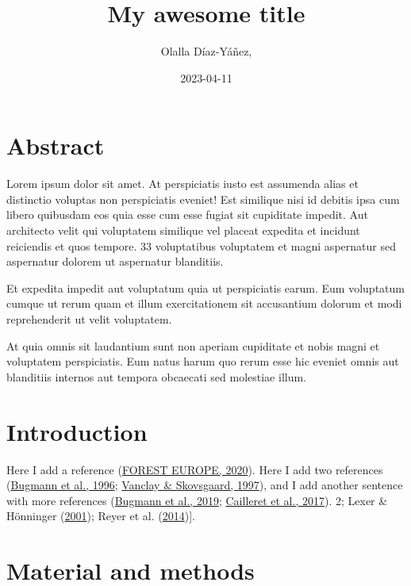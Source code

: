 \documentclass[
  12pt,
]{article}
\title{My awesome title}
\author{Olalla Díaz-Yáñez,}
\date{2023-04-11}
\begin{document}
\maketitle

\hypertarget{abstract}{%
\section{Abstract}\label{abstract}}

Lorem ipsum dolor sit amet. At perspiciatis iusto est assumenda alias et distinctio voluptas non perspiciatis eveniet! Est similique nisi id debitis ipsa cum libero quibusdam eos quia esse cum esse fugiat sit cupiditate impedit. Aut architecto velit qui voluptatem similique vel placeat expedita et incidunt reiciendis et quos tempore. 33 voluptatibus voluptatem et magni aspernatur sed aspernatur dolorem ut aspernatur blanditiis.

Et expedita impedit aut voluptatum quia ut perspiciatis earum. Eum voluptatum cumque ut rerum quam et illum exercitationem sit accusantium dolorum et modi reprehenderit ut velit voluptatem.

At quia omnis sit laudantium sunt non aperiam cupiditate et nobis magni et voluptatem perspiciatis. Eum natus harum quo rerum esse hic eveniet omnis aut blanditiis internos aut tempora obcaecati sed molestiae illum.
\newpage

\hypertarget{introduction}{%
\section{Introduction}\label{introduction}}

Here I add a reference (\protect\hyperlink{ref-foresteurope2020}{FOREST EUROPE, 2020}).
Here I add two references (\protect\hyperlink{ref-bugmann1996}{Bugmann et al., 1996}; \protect\hyperlink{ref-vanclay1997}{Vanclay \& Skovsgaard, 1997}),
and I add another sentence with more references (\protect\hyperlink{ref-bugmann2019}{Bugmann et al., 2019}; \protect\hyperlink{ref-cailleret2017}{Cailleret et al., 2017}). 2; Lexer \& Hönninger (\protect\hyperlink{ref-lexer2001}{2001}); Reyer et al. (\protect\hyperlink{ref-reyer2014}{2014}){]}.

\hypertarget{material-and-methods}{%
\section{Material and methods}\label{material-and-methods}}
\end{document}
